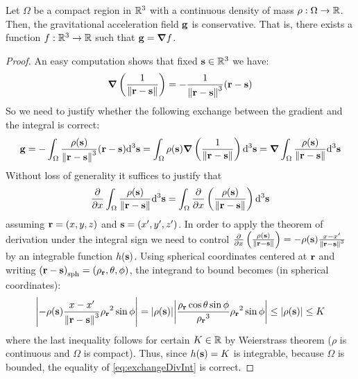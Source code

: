 \documentclass[../main.tex]{subfiles}
\begin{document}
\begin{theorem}\label{thm:conservative}
  Let $\Omega$ be a compact region in $\mathbb{R}^3$ with a continuous density of mass $\rho:\Omega\to\mathbb{R}$. Then, the gravitational acceleration field $\boldsymbol{\mathrm{g}}$ is conservative. That is, there exists a function $f:\mathbb{R}^3\rightarrow\mathbb{R}$ such that $\boldsymbol{\mathrm{g}}=\grad f$.
\end{theorem}
\begin{proof}
  An easy computation shows that fixed $\boldsymbol{\mathrm{s}}\in\mathbb{R}^3$ we have:
  \begin{equation}
    \grad\left(\frac{1}{\left\|\boldsymbol{\mathrm{r}}-\boldsymbol{\mathrm{s}}\right\|}\right)=-\frac{1}{\left\|\boldsymbol{\mathrm{r}}-\boldsymbol{\mathrm{s}}\right\|^3}(\boldsymbol{\mathrm{r}}-\boldsymbol{\mathrm{s}})
  \end{equation}
  So we need to justify whether the following exchange between the gradient and the integral is correct:
  \begin{equation}
    \boldsymbol{\mathrm{g}}=-\int_{\Omega}\frac{\rho(\boldsymbol{\mathrm{s}})}{\left\|\boldsymbol{\mathrm{r}}-\boldsymbol{\mathrm{s}}\right\|^3}(\boldsymbol{\mathrm{r}}-\boldsymbol{\mathrm{s}})\dd^3{\boldsymbol{\mathrm{s}}}=\int_{\Omega}\rho(\boldsymbol{\mathrm{s}})\grad\left(\frac{1}{\left\|\boldsymbol{\mathrm{r}}-\boldsymbol{\mathrm{s}}\right\|}\right)\dd^3{\boldsymbol{\mathrm{s}}}=\grad\int_{\Omega}\frac{\rho(\boldsymbol{\mathrm{s}})}{\left\|\boldsymbol{\mathrm{r}}-\boldsymbol{\mathrm{s}}\right\|}\dd^3{\boldsymbol{\mathrm{s}}}
  \end{equation}
  Without loss of generality it suffices to justify that
  \begin{equation}\label{eq:exchangeDivInt}
    \pdv{}{x}\int_{\Omega}\frac{\rho(\boldsymbol{\mathrm{s}})}{\left\|\boldsymbol{\mathrm{r}}-\boldsymbol{\mathrm{s}}\right\|}\dd^3{\boldsymbol{\mathrm{s}}}=\int_{\Omega}\pdv{}{x}\left(\frac{\rho(\boldsymbol{\mathrm{s}})}{\left\|\boldsymbol{\mathrm{r}}-\boldsymbol{\mathrm{s}}\right\|}\right)\dd^3{\boldsymbol{\mathrm{s}}}
  \end{equation}
  assuming $\boldsymbol{\mathrm{r}}=(x,y,z)$ and $\boldsymbol{\mathrm{s}}=(x',y',z')$. In order to apply the theorem of derivation under the integral sign we need to control $\pdv{}{x}\left(\frac{\rho(\boldsymbol{\mathrm{s}})}{\left\|\boldsymbol{\mathrm{r}}-\boldsymbol{\mathrm{s}}\right\|}\right)=-\rho(\boldsymbol{\mathrm{s}})\frac{x-x'}{\left\|\boldsymbol{\mathrm{r}}-\boldsymbol{\mathrm{s}}\right\|^3}$ by an integrable function $h(\boldsymbol{\mathrm{s}})$. Using spherical coordinates centered at $\boldsymbol{\mathrm{r}}$ and writing ${(\boldsymbol{\mathrm{r}}-\boldsymbol{\mathrm{s}})}_{\mathrm{sph}}=(\rho_{\boldsymbol{\mathrm{r}}},\theta,\phi)$, the integrand to bound becomes (in spherical coordinates):
  \begin{equation}
    \abs{-\rho(\boldsymbol{\mathrm{s}})\frac{x-x'}{\left\|\boldsymbol{\mathrm{r}}-\boldsymbol{\mathrm{s}}\right\|^3}{\rho_{\boldsymbol{\mathrm{r}}}}^2\sin\phi}=\abs{\rho(\boldsymbol{\mathrm{s}})}\abs{\frac{{\rho_{\boldsymbol{\mathrm{r}}}}\cos\theta\sin\phi}{{\rho_{\boldsymbol{\mathrm{r}}}}^3}{\rho_{\boldsymbol{\mathrm{r}}}}^2\sin\phi}\leq \abs{\rho(\boldsymbol{\mathrm{s}})}\leq K
  \end{equation}
  where the last inequality follows for certain $K\in\mathbb{R}$ by Weierstrass theorem ($\rho$ is continuous and $\Omega$ is compact). Thus, since $h(\boldsymbol{\mathrm{s}})=K$ is integrable, because $\Omega$ is bounded, the equality of \cref{eq:exchangeDivInt} is correct.
\end{proof}
\end{document}
